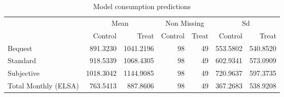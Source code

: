 \begin{table}

\caption{Model consumption predictions \label{tab:simulation_prediction}}
\centering
\begin{tabular}[t]{lrrrrrr}
\toprule
\multicolumn{1}{c}{ } & \multicolumn{2}{c}{Mean} & \multicolumn{2}{c}{Non Missing} & \multicolumn{2}{c}{Sd} \\
\cmidrule(l{3pt}r{3pt}){2-3} \cmidrule(l{3pt}r{3pt}){4-5} \cmidrule(l{3pt}r{3pt}){6-7}
 & Control & Treat & Control & Treat & Control & Treat\\
\midrule
Bequest & 891.3230 & 1041.2196 & 98 & 49 & 553.5802 & 540.8520\\
Standard & 918.5339 & 1068.4305 & 98 & 49 & 602.9341 & 573.0909\\
Subjective & 1018.3042 & 1144.9085 & 98 & 49 & 720.9637 & 597.3735\\
Total Monthly (ELSA) & 763.5413 & 887.8606 & 98 & 49 & 367.2683 & 538.9208\\
\bottomrule
\end{tabular}
\end{table}
